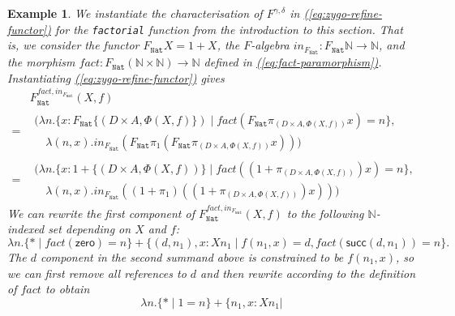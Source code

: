 \documentclass{LMCS}
\newcommand{\tyname}[1]{\texttt{#1}}
\newcommand{\inn}{\mathit{in}}
\newcommand{\sepbar}{\mathrel|}
\newtheorem{eorollary}{Example}
\newcommand{\parenref}[1]{\hyperref[#1]{(\ref*{#1})}}
\begin{document}
\begin{eorollary}\label{ex:factorial-refine}
  We instantiate the characterisation of $F^{\gamma,\delta}$
  in \parenref{eq:zygo-refine-functor} for the \texttt{factorial}
  function from the introduction to this section. That is, we consider
  the functor $F_{\tyname{Nat}}X = 1 + X$, the $F$-algebra
  $\inn_{F_{\tyname{Nat}}} : F_{\tyname{Nat}} \mathbb{N} \to
  \mathbb{N}$, and the morphism $\mathit{fact} : F_{\tyname{Nat}}
  (\mathbb{N} \times \mathbb{N}) \to \mathbb{N}$ defined
  in \parenref{eq:fact-paramorphism}.  Instantiating
  \parenref{eq:zygo-refine-functor} gives
  \begin{displaymath}
    \begin{array}{cl}
      & F_{\tyname{Nat}}^{\mathit{fact},\inn_{F_{\tyname{Nat}}}}(X,f) \\
      =&
      \begin{array}{l}
        (\lambda n.\{ x : F_{\tyname{Nat}}\{(D \times A, \Phi(X,f)\}) \sepbar \mathit{fact}(F_{\tyname{Nat}}\pi_{(D \times A, \Phi(X,f))}x) = n \}, \\
        \quad\lambda (n,x).\inn_{F_{\tyname{Nat}}} (F_{\tyname{Nat}}\pi_1(F_{\tyname{Nat}}\pi_{(D \times A, \Phi(X,f))}x)))
      \end{array}
 \\
      =&
      \begin{array}{l}
        (\lambda n. \{ x : 1 + \{(D \times A, \Phi(X,f))\} \sepbar \mathit{fact}((1 + \pi_{(D \times A, \Phi(X,f))})x) = n \},\\
        \quad\lambda (n,x). \inn_{F_{\tyname{Nat}}} ((1 + \pi_1)((1 + \pi_{(D \times A, \Phi(X,f))})x)))
      \end{array}
    \end{array}
  \end{displaymath}
  We can rewrite the first component of
  $F^{\mathit{fact},\inn_{F_{\tyname{Nat}}}}_{\tyname{Nat}}(X,f)$ to the following
  $\mathbb{N}$-indexed set depending on $X$ and $f$:
  \begin{displaymath}
    \lambda n. \{ * \sepbar \mathit{fact}(\mathsf{zero}) = n \} + \{ (d,n_1),
    x : X n_1 \sepbar f(n_1,x) = d, \mathit{fact}(\mathsf{succ}(d,n_1)) = n \}.
  \end{displaymath}
  The $d$ component in the second summand above is constrained to be
  $f(n_1,x)$, so we can first remove all references to $d$ and then
  rewrite according to the definition of $\mathit{fact}$ to obtain
  \begin{displaymath}
    \lambda n. \{ * \sepbar 1 = n \} + \{ n_1, x : X n_1 \sepbar 

\end{displaymath}
\end{eorollary}
\end{document}
